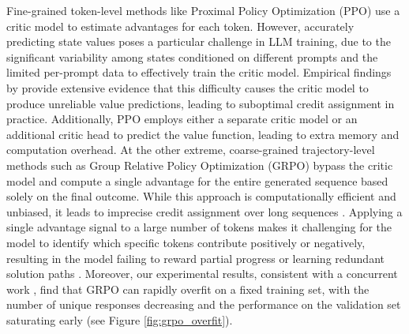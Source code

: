 Fine-grained token-level methods like Proximal Policy Optimization (PPO) \cite{schulman2017proximalpolicyoptimizationalgorithms} use a critic model to estimate advantages for each token. However, accurately predicting state values poses a particular challenge in LLM training, due to the significant variability among states conditioned on different prompts and the limited per-prompt data to effectively train the critic model. Empirical findings by \cite{kazemnejad2024vineppounlockingrlpotential} provide extensive evidence that this difficulty causes the critic model to produce unreliable value predictions, leading to suboptimal credit assignment in practice. Additionally, PPO employs either a separate critic model or an additional critic head to predict the value function, leading to extra memory and computation overhead. At the other extreme, coarse-grained trajectory-level methods such as Group Relative Policy Optimization (GRPO) \cite{shao2024deepseekmathpushinglimitsmathematical} bypass the critic model and compute a single advantage for the entire generated sequence based solely on the final outcome. While this approach is computationally efficient and unbiased, it leads to imprecise credit assignment over long sequences \cite{kazemnejad2024vineppounlockingrlpotential}. Applying a single advantage signal to a large number of tokens makes it challenging for the model to identify which specific tokens contribute positively or negatively, resulting in the model failing to reward partial progress or learning redundant solution paths \cite{qu2025optimizingtesttimecomputemeta}. Moreover, our experimental results, consistent with a concurrent work \cite{yu2025dapoopensourcellmreinforcement}, find that GRPO can rapidly overfit on a fixed training set, with the number of unique responses decreasing and the performance on the validation set saturating early (see Figure \ref{fig:grpo_overfit}). 

